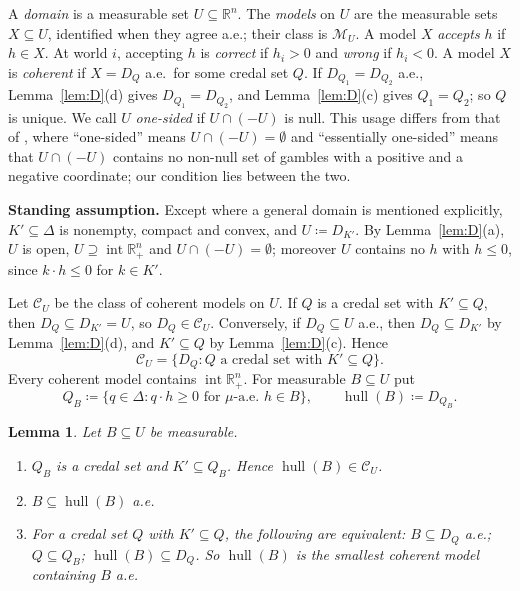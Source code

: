 \documentclass[11pt]{article}
\newcommand{\R}{\mathbb{R}}
\newcommand{\M}{\mathcal{M}}
\newcommand{\CC}{\mathcal{C}}
\newcommand{\hull}{\operatorname{hull}}
\newcommand{\Rpp}{\inter\R^n_{+}}
\DeclareMathOperator{\inter}{int}
\theoremstyle{plain}
\newtheorem{lemma}[theorem]{Lemma}
\theoremstyle{definition}
\theoremstyle{remark}
\begin{document}
A \emph{domain} is a measurable set $U\subseteq\R^n$. The \emph{models} on $U$ are the
measurable sets $X\subseteq U$, identified when they agree a.e.; their class is $\M_U$.
A model $X$ \emph{accepts} $h$ if $h\in X$. At world $i$, accepting $h$ is \emph{correct}
if $h_i>0$ and \emph{wrong} if $h_i<0$. A model $X$ is \emph{coherent} if $X=D_Q$ a.e.\
for some credal set $Q$. If $D_{Q_1}=D_{Q_2}$ a.e., Lemma~\ref{lem:D}(d) gives $D_{Q_1}=
D_{Q_2}$, and Lemma~\ref{lem:D}(c) gives $Q_1=Q_2$; so $Q$ is unique. We call $U$
\emph{one-sided} if $U\cap(-U)$ is null. This usage differs from that of
\cite{KCM}, where ``one-sided'' means $U\cap(-U)=\emptyset$ and ``essentially one-sided''
means that $U\cap(-U)$ contains no non-null set of gambles with a positive and a negative
coordinate; our condition lies between the two.

\smallskip\noindent\textbf{Standing assumption.} Except where a general domain is
mentioned explicitly, $K'\subseteq\Delta$ is nonempty, compact and convex, and
$U\coloneqq D_{K'}$. By Lemma~\ref{lem:D}(a), $U$ is open, $U\supseteq\Rpp$ and $U\cap
(-U)=\emptyset$; moreover $U$ contains no $h$ with $h\le0$, since $k\cdot h\le0$ for
$k\in K'$.

\smallskip
Let $\CC_U$ be the class of coherent models on $U$. If $Q$ is a credal set with
$K'\subseteq Q$, then $D_Q\subseteq D_{K'}=U$, so $D_Q\in\CC_U$. Conversely, if $D_Q
\subseteq U$ a.e., then $D_Q\subseteq D_{K'}$ by Lemma~\ref{lem:D}(d), and $K'\subseteq
Q$ by Lemma~\ref{lem:D}(c). Hence
\[
  \CC_U=\{D_Q: Q\text{ a credal set with }K'\subseteq Q\}.
\]
Every coherent model contains $\Rpp$. For measurable $B\subseteq U$ put
\[
  Q_B\coloneqq\{q\in\Delta: q\cdot h\ge0\text{ for $\mu$-a.e.\ }h\in B\},\qquad
  \hull(B)\coloneqq D_{Q_B}.
\]

\begin{lemma}\label{lem:hull}
Let $B\subseteq U$ be measurable.
\begin{enumerate}[label=(\alph*)]
  \item $Q_B$ is a credal set and $K'\subseteq Q_B$. Hence $\hull(B)\in\CC_U$.
  \item $B\subseteq\hull(B)$ a.e.
  \item For a credal set $Q$ with $K'\subseteq Q$, the following are equivalent:
  $B\subseteq D_Q$ a.e.; $Q\subseteq Q_B$; $\hull(B)\subseteq D_Q$. So $\hull(B)$ is the
  smallest coherent model containing $B$ a.e.
\end{enumerate}
\end{lemma}
\end{document}
